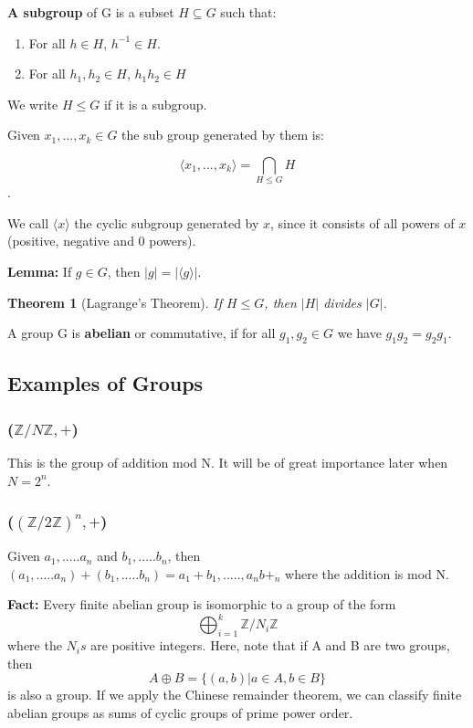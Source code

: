 \documentclass{article}
\newtheorem{thm}{Theorem}
\newcommand{\Z}{\mathbb{Z}}
\begin{document}
\vspace{3mm}

\textbf{A subgroup} of G is a subset $H \subseteq G$ such that:
\begin{enumerate}
	\item For all $h \in H$, $h^{-1} \in H$.
	\item For all $h_{1}, h_{2} \in H$, $h_{1}h_{2} \in H$
\end{enumerate}
We write $H \le G$ if it is a subgroup.

Given $x_{1},...,x_{k} \in G$ the sub group generated by them is:

$$\langle x_{1},...,x_{k}\rangle = \bigcap_{H \leq G} H$$.

We call $\langle x\rangle$ the cyclic subgroup generated by $x$, since it consists of all powers of $x$ (positive, negative and 0 powers).

\textbf{Lemma:} If $g \in G$, then $|g|=|\langle g\rangle|$. 

\begin{thm}[Lagrange's Theorem]
If $H \le G$, then $|H|$ divides $|G|$.
\end{thm}

A group G is \textbf{abelian} or commutative, if for all $g_{1}, g_{2} \in G$ we have $g_{1}g_{2} = g_{2}g_{1}$.

\subsection{Examples of Groups}
\subsubsection{($\Z / N\Z,+$)} 
This is the group of addition mod N. It will be of great importance later when $N=2^{n}$.

\subsubsection{($(\Z / 2\Z)^{n},+$)} 
Given $a_{1},.....a_{n}$ and $b_{1},.....b_{n}$, then $(a_{1},.....a_{n})+(b_{1},.....b_{n}) = a_{1}+b_{1},.....,a_{n}b+_{n}$ where the addition is mod N.

\textbf{Fact:} Every finite abelian group is isomorphic to a group of the form $$\bigoplus_{i=1}^{k}\Z / N_{i}\Z$$ where the $N_{i}s$ are positive integers.
Here, note that if A and B are two groups, then $$A\oplus B = \{(a,b) | a \in A, b \in B\}$$ is also a group.
If we apply the Chinese remainder theorem, we can classify finite abelian groups as sums of cyclic groups of prime power order.
\end{document}

